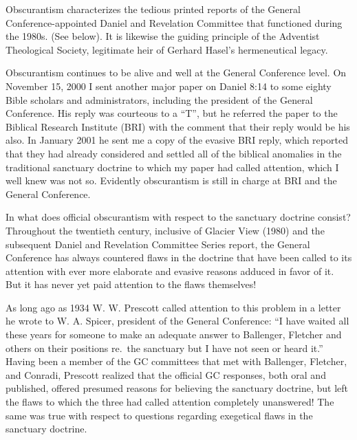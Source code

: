Obscurantism characterizes the tedious printed reports of the General
Conference-appointed Daniel and Revelation Committee that functioned during
the 1980s. (See below). It is likewise the guiding principle of the
Adventist Theological Society, legitimate heir of Gerhard Hasel's
hermeneutical legacy.

Obscurantism continues to be alive and well at the General Conference level.
On November 15, 2000 I sent another major paper on Daniel 8:14 to some
eighty Bible scholars and administrators, including the president of the
General Conference. His reply was courteous to a ``T'', but he referred the
paper to the Biblical Research Institute (BRI) with the comment that their
reply would be his also. In January 2001 he sent me a copy of the evasive
BRI reply, which reported that they had already considered and settled all
of the biblical anomalies in the traditional sanctuary doctrine to which my
paper had called attention, which I well knew was not so. Evidently
obscurantism is still in charge at BRI and the General Conference.

In what does official obscurantism with respect to the sanctuary doctrine
consist? Throughout the twentieth century, inclusive of Glacier View (1980)
and the subsequent Daniel and Revelation Committee Series report, the
General Conference has always countered flaws in the doctrine that have been
called to its attention with ever more elaborate and evasive reasons adduced
in favor of it. But it has never yet paid attention to the flaws themselves!

As long ago as 1934 W. W. Prescott called attention to this problem in a
letter he wrote to W. A. Spicer, president of the General Conference: ``I
have waited all these years for someone to make an adequate answer to
Ballenger, Fletcher and others on their positions re.\ the sanctuary but I
have not seen or heard it.'' Having been a member of the GC committees
that met with Ballenger, Fletcher, and Conradi, Prescott realized that the
official GC responses, both oral and published, offered presumed reasons for
believing the sanctuary doctrine, but left the flaws to which the three had
called attention completely unanswered! The same was true with respect to
questions regarding exegetical flaws in the sanctuary doctrine.
